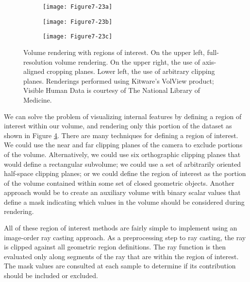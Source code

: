 \begin{figure}[!htb]
	\centering
	\begin{subfigure}{0.48\linewidth}
		\centering
		\texttt{[image: Figure7-23a]}
		\caption*{}\label{fig:Figure7-23a}
	\end{subfigure}
	\hfill
	\begin{subfigure}{0.48\linewidth}
		\centering
		\texttt{[image: Figure7-23b]}
		\captionsetup{justification=centering}
		\caption*{}\label{fig:Figure7-23b}
	\end{subfigure}%
	\hfill
	\medbreak
	\begin{subfigure}{0.48\linewidth}
		\centering
		\texttt{[image: Figure7-23c]}
		\captionsetup{justification=centering}
		\caption*{}\label{fig:Figure7-23c}
	\end{subfigure}%
	\caption{Volume rendering with regions of interest. On the upper left, full-resolution volume rendering. On the upper right, the use of axis-aligned cropping planes. Lower left, the use of arbitrary clipping planes. Renderings performed using Kitware's VolView product; Visible Human Data is courtesy of The National Library of Medicine.}
	\label{fig:Figure7-23}
\end{figure}

We can solve the problem of visualizing internal features by defining a region of interest within our volume, and rendering only this portion of the dataset as shown in Figure \ref{fig:Figure7-23}. There are many techniques for defining a region of interest. We could use the near and far clipping planes of the camera to exclude portions of the volume. Alternatively, we could use six orthographic clipping planes that would define a rectangular subvolume; we could use a set of arbitrarily oriented half-space clipping planes; or we could define the region of interest as the portion of the volume contained within some set of closed geometric objects. Another approach would be to create an auxiliary volume with binary scalar values that define a mask indicating which values in the volume should be considered during rendering.

All of these region of interest methods are fairly simple to implement using an image-order ray casting approach. As a preprocessing step to ray casting, the ray is clipped against all geometric region definitions. The ray function is then evaluated only along segments of the ray that are within the region of interest. The mask values are consulted at each sample to determine if its contribution should be included or excluded.

